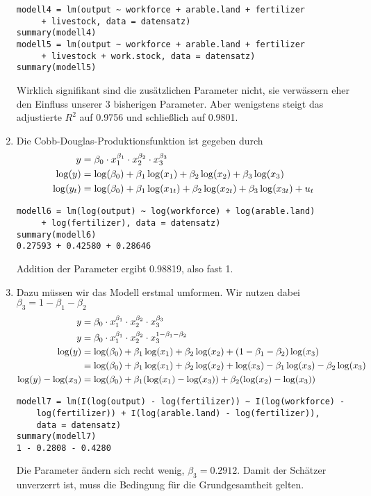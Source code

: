 \documentclass{article}
\begin{document}
\begin{enumerate}[label=(\alph*)]
		\begin{lstlisting}[style=R]
modell4 = lm(output ~ workforce + arable.land + fertilizer
	 + livestock, data = datensatz)
summary(modell4)
modell5 = lm(output ~ workforce + arable.land + fertilizer
	 + livestock + work.stock, data = datensatz)
summary(modell5)
		\end{lstlisting}
		Wirklich signifikant sind die zusätzlichen Parameter nicht, sie verwässern eher den Einfluss unserer 3 bisherigen Parameter. Aber wenigstens steigt das adjustierte $R^2$ auf 0.9756 und schließlich auf 0.9801.
		\item Die Cobb-Douglas-Produktionsfunktion ist gegeben durch
		\begin{align}
			y &= \beta_0 \cdot x_1^{\beta_1}\cdot x_2^{\beta_2}\cdot x_3^{\beta_3} \notag \\
			\log(y) &= \log(\beta_0)  + \beta_1\log(x_1) + \beta_2\log(x_2) + \beta_3\log(x_3) \notag \\
			\log(y_t) &= \log(\beta_0)  + \beta_1\log(x_{1t}) + \beta_2\log(x_{2t}) + \beta_3\log(x_{3t}) + u_t \notag
		\end{align}
		\begin{lstlisting}[style=R]
modell6 = lm(log(output) ~ log(workforce) + log(arable.land)
	 + log(fertilizer), data = datensatz)
summary(modell6)
0.27593 + 0.42580 + 0.28646
		\end{lstlisting}
		Addition der Parameter ergibt 0.98819, also fast 1.
		\item Dazu müssen wir das Modell erstmal umformen. Wir nutzen dabei $\beta_3 = 1-\beta_1 - \beta_2$
		\begin{align}
			y &= \beta_0 \cdot x_1^{\beta_1}\cdot x_2^{\beta_2}\cdot x_3^{\beta_3} \notag \\
			y &= \beta_0 \cdot x_1^{\beta_1}\cdot x_2^{\beta_2}\cdot x_3^{1-\beta_1-\beta_2} \notag \\
			\log(y) &= \log(\beta_0)  + \beta_1\log(x_1) + \beta_2\log(x_2) + (1-\beta_1-\beta_2)\log(x_3) \notag \\
			&= \log(\beta_0)  + \beta_1\log(x_1) + \beta_2\log(x_2) + \log(x_3) - \beta_1\log(x_3) - \beta_2\log(x_3) \notag \\
			\log(y) - \log(x_3) &= \log(\beta_0)  + \beta_1(\log(x_1) - \log(x_3)) + \beta_2(\log(x_2) - \log(x_3)) \notag
		\end{align}
		\begin{lstlisting}[style=R]
modell7 = lm(I(log(output) - log(fertilizer)) ~ I(log(workforce) - 
	log(fertilizer)) + I(log(arable.land) - log(fertilizer)), 
	data = datensatz)
summary(modell7)
1 - 0.2808 - 0.4280
		\end{lstlisting}
		Die Parameter ändern sich recht wenig, $\beta_3 = 0.2912$. Damit der Schätzer unverzerrt ist, muss die Bedingung für die Grundgesamtheit gelten.
	\end{enumerate}
	
\end{document}

